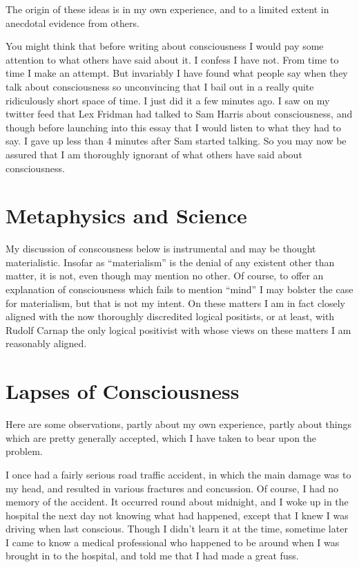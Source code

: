 \documentclass[10pt,titlepage]{article}
\begin{document}
The origin of these ideas is in my own experience, and to a limited extent in anecdotal evidence from others.

You might think that before writing about consciousness I would pay some attention to what others have said about it.
I confess I have not.
From time to time I make an attempt.
But invariably I have found what people say when they talk about consciousness so unconvincing that I bail out in a really quite ridiculously short space of time.
I just did it a few minutes ago.
I saw on my twitter feed that Lex Fridman had talked to Sam Harris about consciousness, and though before launching into this essay that I would listen to what they had to say.
I gave up less than 4 minutes after Sam started talking.
So you may now be assured that I am thoroughly ignorant of what others have said about consciousness.

\section{Metaphysics and Science}

My discussion of conscousness below is instrumental and may be thought materialistic.
Insofar as ``materialism'' is the denial of any existent other than matter, it is not, even though may mention no other.
Of course, to offer an explanation of consciousness which fails to mention ``mind'' I may bolster the case for materialism, but that is not my intent.
On these matters I am in fact closely aligned with the now thoroughly discredited logical positists, or at least, with Rudolf Carnap the only logical positivist with whose views on these matters I am reasonably aligned.

\section{Lapses of Consciousness}

Here are some observations, partly about my own experience, partly about things which are pretty generally accepted, which I have taken to bear upon the problem.

I once had a fairly serious road traffic accident, in which the main damage was to my head, and resulted in various fractures and concussion.
Of course, I had no memory of the accident.
It occurred round about midnight, and I woke up in the hospital the next day not knowing what had happened, except that I knew I was driving when last conscious.
Though I didn't learn it at the time, sometime later I came to know a medical professional who happened to be around when I was brought in to the hospital, and told me that I had made a great fuss.
\end{document}
